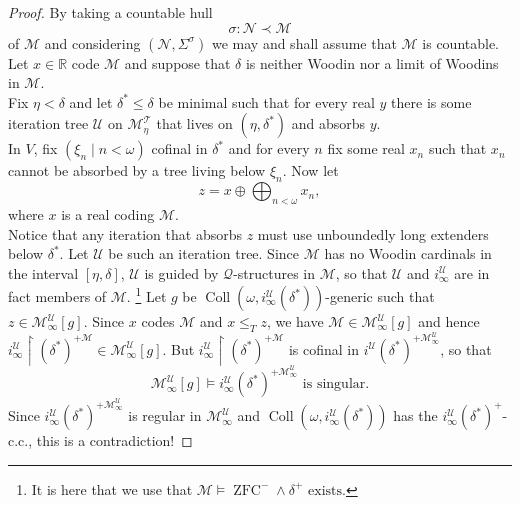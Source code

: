 \documentclass[12pt,a4paper]{article}
\theoremstyle{nicestyle}
\DeclareMathOperator{\zfc}{ZFC}
\DeclareMathOperator{\coll}{Coll}
\begin{document}
\begin{proof}
  By taking a countable hull
  \[
    \sigma \colon \mathcal{N} \prec \mathcal{M}
  \]
  of $\mathcal{M}$ and considering $(\mathcal{N}, \Sigma^{\sigma})$ we
  may and shall assume that $\mathcal{M}$ is countable. Let
  $x \in \mathbb{R}$ code $\mathcal{M}$ and suppose that $\delta$ is
  neither Woodin nor a limit of Woodins in $\mathcal{M}$. \\
  
  Fix $\eta < \delta$ and let $\delta^{*} \le \delta$ be minimal such
  that for every real $y$ there is some iteration tree $\mathcal{U}$
  on $\mathcal{M}^{\mathcal{T}}_{\eta}$ that lives on
  $(\eta, \delta^{*})$ and absorbs $y$. \\
  In $V$, fix $(\xi_{n} \mid n < \omega)$ cofinal in $\delta^{*}$ and
  for every $n$ fix some real $x_{n}$ such that $x_{n}$ cannot be
  absorbed by a tree living below $\xi_{n}$. Now let
  \[
    z = x \oplus \bigoplus_{n < \omega} x_{n},
  \]
  where $x$ is a real coding $\mathcal{M}$. \\
  Notice that any iteration that absorbs $z$ must use unboundedly long
  extenders below $\delta^{*}$. Let $\mathcal{U}$ be such an iteration
  tree. Since $\mathcal{M}$ has no Woodin cardinals in the interval
  $[\eta, \delta]$, $\mathcal{U}$ is guided by
  $\mathcal{Q}$-structures in $\mathcal{M}$, so that $\mathcal{U}$ and
  $i_{\infty}^{\mathcal{U}}$ are in fact members of
  $\mathcal{M}$. \footnote{It is here that we use that
    $\mathcal{M} \models \zfc^{-} \wedge \delta^{+} \text{ exists}$.}
  Let $g$ be
  $\coll(\omega,i^{\mathcal{U}}_{\infty} (\delta^{*}))$-generic such
  that $z \in \mathcal{M}^{\mathcal{U}}_{\infty}[g]$. Since $x$ codes
  $\mathcal{M}$ and $x \le_{T} z$, we have
  $\mathcal{M} \in \mathcal{M}^{\mathcal{U}}_{\infty}[g]$ and hence
  $i^{\mathcal{U}}_{\infty} \restriction (\delta^{*})^{+\mathcal{M}}
  \in \mathcal{M}^{\mathcal{U}}_{\infty}[g]$. But
  $i^{\mathcal{U}}_{\infty} \restriction (\delta^{*})^{+\mathcal{M}}$
  is cofinal in
  $i^{\mathcal{U}}(\delta^{*})^{+
    \mathcal{M}^{\mathcal{U}}_{\infty}}$, so that
  \[
    \mathcal{M}^{\mathcal{U}}_{\infty}[g] \models i^{\mathcal{U}}_{\infty}(\delta^{*})^{+
    \mathcal{M}^{\mathcal{U}}_{\infty}} \text{ is singular}.
  \]
  Since
  $i^{\mathcal{U}}_{\infty}(\delta^{*})^{+
    \mathcal{M}^{\mathcal{U}}_{\infty}}$ is regular in
  $\mathcal{M}^{\mathcal{U}}_{\infty}$ and
  $\coll(\omega, i^{\mathcal{U}}_{\infty}(\delta^{*}))$ has the
  $i^{\mathcal{U}}_{\infty}(\delta^{*})^{+}$-c.c., this is a
  contradiction!
\end{proof}
\end{document}
